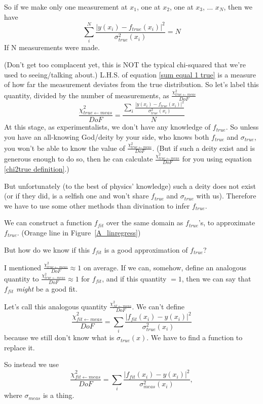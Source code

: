 \documentclass[a4paper, 12pt]{article}
\newcommand{\chifit}{\frac{\chi^2_{fit\leftarrow meas}}{DoF} }
\newcommand{\chitrue}{\frac{\chi^2_{true\leftarrow meas}}{DoF}}
\begin{document}
So if we make only one measurement at $x_1$, one at $x_2$, one at $x_3$, ... $x_N$, then we have
\begin{equation}\label{sum equal 1 true}
    \sum_i^N \frac{|y(x_i)-f_{true}(x_i)|^2}{\sigma^2_{true}(x_i)}=N
\end{equation}
If N measurements were made. 

(Don't get too complacent yet, this is NOT the typical chi-squared that we're used to seeing/talking about.)
L.H.S. of equation \ref{sum equal 1 true} is a measure of how far the measurement deviates from the true distribution. So let's label this quantity, divided by the number of measurements, as $\chitrue$
\begin{equation}\label{chi2true definition}
\chitrue = \frac{\sum_i \frac{|y(x_i)-f_{true}(x_i)|^2}{\sigma^2_{true}(x_i)}}{N}
\end{equation}
At this stage, as experimentalists, we don't have any knowledge of $f_{true}$. So unless you have an all-knowing God/deity by your side, who knows both $f_{true}$ and $\sigma_{true}$, you won't be able to know the value of $\chitrue$. (But if such a deity exist and is generous enough to do so, then he can calculate $\chitrue$ for you using equation \ref{chi2true definition}.)

But unfortunately (to the best of physics' knowledge) such a deity does not exist (or if they did, is a selfish one and won't share $f_{true}$ and $\sigma_{true}$ with us). Therefore we have to use some other methods than divination to infer $f_{true}$.

We can construct a function $f_{fit}$ over the same domain as $f_{true}$'s, to approximate $f_{true}$. (Orange line in Figure~\ref{A_linregress})

But how do we know if this $f_{fit}$ is a good approximation of $f_{true}$?

I mentioned $\chitrue \approx 1$ on average. If we can, somehow, define an analogous quantity to $\chitrue \approx 1$ for $f_{fit}$, and if this quantity $=1$, then we can say that $f_{fit}$ \textit{might} be a good fit. 

Let's call this analogous quantity $\chifit$. We can't define $$\chifit = \sum_i \frac{|f_{fit}(x_i) - y(x_i)|^2}{\sigma_{true}^2(x_i)}$$ because we still don't know what is $\sigma_{true}(x)$. We have to find a function to replace it.

So instead we use 
\begin{equation}\label{chi2meas definition}
    \chifit = \sum_i \frac{|f_{fit}(x_i) - y(x_i)|^2} {\sigma_{meas}^2(x_i)} ,
\end{equation}
where $\sigma_{meas}$ is a thing.
\end{document}
